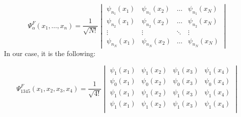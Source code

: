 \begin{equation} \label{eq:4}
\Psi^{F}_{\alpha} \left( x_{1}, \dots, x_{n} \right)
=
\frac{1}{\sqrt{N!}}
\begin{vmatrix}
\psi_{n_{1}} \left( x_{1} \right) & \psi_{n_{1}} \left( x_{2} \right) & \dots  & \psi_{n_{1}} \left( x_{N} \right) \\
\psi_{n_{2}} \left( x_{1} \right) & \psi_{n_{2}} \left( x_{2} \right) & \dots  & \psi_{n_{2}} \left( x_{N} \right) \\
\vdots                            & \vdots                            & \ddots & \vdots \\
\psi_{n_{N}} \left( x_{1} \right) & \psi_{n_{N}} \left( x_{2} \right) & \dots  & \psi_{n_{N}} \left( x_{N} \right)
\end{vmatrix}
\end{equation}
In our case, it is the following:

\begin{equation} \label{eq:5}
\Psi^{F}_{1345} \left( x_{1}, x_{2}, x_{3}, x_{4} \right)
=
\frac{1}{\sqrt{4!}}
\begin{vmatrix}
\psi_{1} \left( x_{1} \right) & \psi_{1} \left( x_{2} \right) & \psi_{1} \left( x_{3} \right)  & \psi_{1} \left( x_{4} \right) \\
\psi_{0} \left( x_{1} \right) & \psi_{0} \left( x_{2} \right) & \psi_{0} \left( x_{3} \right)  & \psi_{0} \left( x_{4} \right) \\
\psi_{1} \left( x_{1} \right) & \psi_{1} \left( x_{2} \right) & \psi_{1} \left( x_{3} \right)  & \psi_{1} \left( x_{4} \right) \\
\psi_{1} \left( x_{1} \right) & \psi_{1} \left( x_{2} \right) & \psi_{1} \left( x_{3} \right)  & \psi_{1} \left( x_{4} \right) \\
\end{vmatrix}
\end{equation}